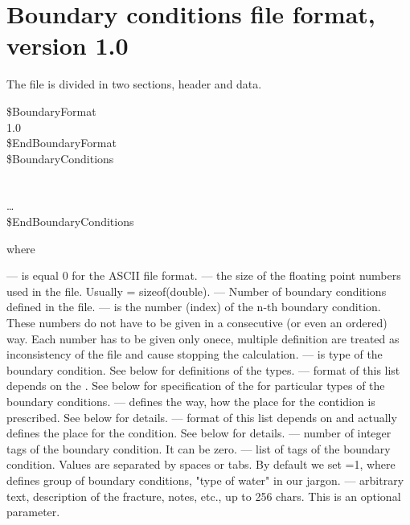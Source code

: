 \section*{Boundary conditions file format, version 1.0}
The file is divided in two sections, header and data.
\begin{fileformat}
\$BoundaryFormat\\
  1.0  \\
\$EndBoundaryFormat\\
\$BoundaryConditions\\
  \\
    
   
    \vari{[text]}\\
  \dots\\
\$EndBoundaryConditions\\
\end{fileformat}
where
\begin{description}
  --- is equal 0 for the ASCII file format.
  --- the size of the floating point numbers used in
  the file. Usually  = sizeof(double).
  --- Number of boundary conditions defined in the
  file.
  --- is the number (index) of the n-th boundary
  condition. These numbers do not have to be given in a consecutive (or even an
  ordered) way. Each number has to be given only onece, multiple definition
  are treated as inconsistency of the file and cause stopping the
  calculation.
  --- is type of the boundary condition. See below for
   definitions of the types.
  --- format of this list depends on the
   . See below for specification of the 
   for particular types of the boundary conditions.
  --- defines the way, how the place for the contidion is
   prescribed. See below for details.
  --- format of this list depends on 
   and actually defines the place for the condition. See below for details.
  --- number of integer tags of the boundary
  condition. It can be zero.
  --- list of tags of the
   boundary condition. Values are
   separated by spaces or tabs. By default we set
   =1, where  defines group of boundary
   conditions, "type of water" in our jargon.
  --- arbitrary text, description of the fracture, notes,
   etc., up to 256 chars. This is an optional parameter.
\end{description}
